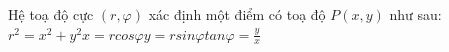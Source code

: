 \documentclass[preview]{standalone}
\begin{document}
\begin{center}
Hệ toạ độ cực $(r,\varphi)$ xác định một điểm có toạ độ $P(x,y)$ như sau:$r^2=x^2+y^2$$x=rcos\varphi$$y=rsin\varphi$$tan\varphi=\frac{y}{x}$
\end{center}
\end{document}
